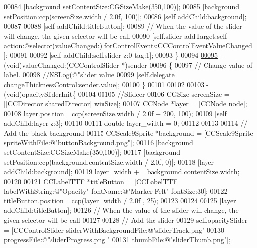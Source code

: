 \begin{DoxyCode}
00084     [background setContentSize:CGSizeMake(350,100)];
00085     [background setPosition:ccp(screenSize.width / 2.0f, 100)];
00086     [\textcolor{keyword}{self} addChild:background];
00087 
00088     [\textcolor{keyword}{self} addChild:titleButton];
00089     \textcolor{comment}{// When the value of the slider will change, the given selector will be call}
00090     [\textcolor{keyword}{self}.slider addTarget:self action:@selector(valueChanged:) forControlEvents:CCControlEventValueChanged
      ];
00091     
00092     [\textcolor{keyword}{self} addChild:self.slider z:0 tag:1];
00093 \}
00094 
\hypertarget{_controls_layer_8mm_source_l00095}{}\hyperlink{interface_controls_layer_a883bebd74a6a657ded8e74a33ea13228}{00095} - (void)valueChanged:(CCControlSlider *)sender
00096 \{
00097     \textcolor{comment}{// Change value of label.}
00098     \textcolor{comment}{//NSLog(@"slider value %
00099     [\textcolor{keyword}{self}.delegate changeThicknessControl:sender.value];
00100 \}
00101 
00102 
00103 - (void)opacitySliderInit\{
00104     
00105     \textcolor{comment}{//Slideer}
00106     CGSize screenSize = [[CCDirector sharedDirector] winSize];
00107     CCNode *layer                       = [CCNode node];
00108     layer.position                      =ccp(screenSize.width / 2.0f + 200, 100);
00109     [\textcolor{keyword}{self} addChild:layer z:3];
00110     
00111     \textcolor{keywordtype}{double} layer\_width = 0;
00112 
00113     
00114     \textcolor{comment}{// Add the black background}
00115     CCScale9Sprite *background = [CCScale9Sprite spriteWithFile:@"buttonBackground.png"];
00116     [background setContentSize:CGSizeMake(350,100)];
00117     [background setPosition:ccp(background.contentSize.width / 2.0f, 0)];
00118     [layer addChild:background];
00119     layer\_width += background.contentSize.width;
00120 
00121     CCLabelTTF *titleButton = [CCLabelTTF labelWithString:@"Opacity" fontName:@"Marker Felt" fontSize:30];
00122     titleButton.position =ccp(layer\_width / 2.0f , 25);
00123     
00124     
00125     [layer addChild:titleButton];
00126     \textcolor{comment}{// When the value of the slider will change, the given selector will be call}
00127     
00128     \textcolor{comment}{// Add the slider}
00129     \textcolor{keyword}{self}.opacitySlider                     = [CCControlSlider sliderWithBackgroundFile:@"sliderTrack.png"
00130                                                                           progressFile:@"sliderProgress.png
      "
00131                                                                              thumbFile:@"sliderThumb.png"];
}
\end{DoxyCode}
